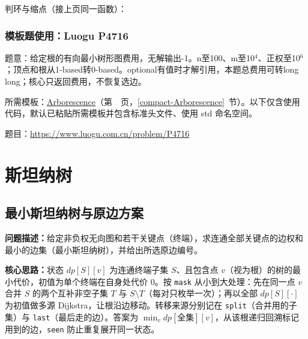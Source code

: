 \Needspace{440pt}



\newpage

\noindent 判环与缩点（接上页同一函数）：



\Needspace{374pt}

\subsection*{模板题使用：Luogu P4716}

\label{usage-example-149}

题意：给定根的有向最小树形图费用，无解输出-1。n至100、m至10$^{4}$、正权至10$^{6}$；顶点和根从1-based转0-based。optional有值时才解引用，本题总费用可转long long；核心只返回费用，不恢复选边。

所需模板：\hyperref[compact-Arborescence]{Arborescence}（第~\pageref{compact-Arborescence}~页，\ref{compact-Arborescence}~节）。以下仅含使用代码，默认已粘贴所需模板并包含标准头文件、使用 std 命名空间。

题目：\url{https://www.luogu.com.cn/problem/P4716}



\Needspace{180pt}

\chapter{斯坦纳树}

\section{最小斯坦纳树与原边方案}\label{compact-SteinerTree}

\noindent\textbf{问题描述：}\allowbreak 给定非负权无向图和若干关键点（终端），求连通全部关键点的边权和最小的边集（最小斯坦纳树），并给出所选原边编号。

\textbf{核心思路：}\allowbreak 状态 $dp[S][v]$ 为连通终端子集 $S$、且包含点 $v$（视为根）的树的最小代价，初值为单个终端在自身处代价 0。按 \texttt{mask} 从小到大处理：先在同一点 $v$ 合并 $S$ 的两个互补非空子集 $T$ 与 $S\setminus T$（每对只枚举一次）；再以全部 $dp[S][\cdot]$ 为初值做多源 Dijkstra，让根沿边移动。转移来源分别记在 \texttt{split}（合并用的子集）与 \texttt{last}（最后走的边）。答案为 $\min_v dp[\text{全集}][v]$，从该根递归回溯标记用到的边，\texttt{seen} 防止重复展开同一状态。

